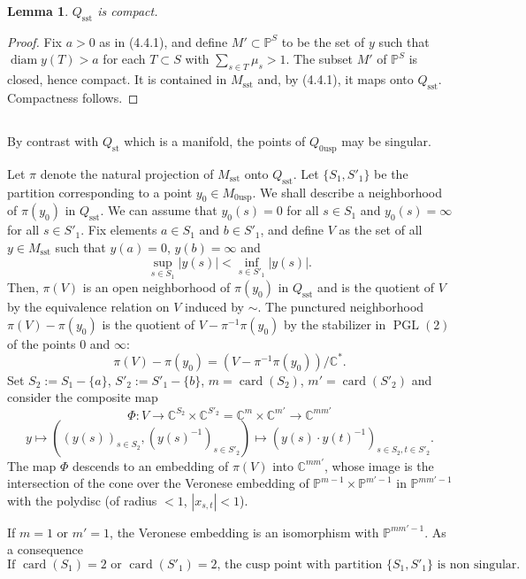 \documentclass[12pt,a4paper]{article}
\theoremstyle{plain}
\newtheorem{lemma}[theorem]{Lemma}
\theoremstyle{definition}
\theoremstyle{remark}
\DeclareMathOperator{\card}{card}
\DeclareMathOperator{\diam}{diam}
\DeclareMathOperator{\PGL}{PGL}
\newcommand{\CC}{\mathbb{C}}
\newcommand{\PP}{\mathbb{P}}
\numberwithin{equation}{section}
\providecommand{\CC}{\mathbb{C}}
\providecommand{\PP}{\mathbb{P}}
\providecommand{\PGL}{\operatorname{PGL}}
\begin{document}
\begin{lemma}\label{lem:4.4.2}
$Q_{\mathrm{sst}}$ is compact.
\end{lemma}

\begin{proof}
Fix $a > 0$ as in (4.4.1), and define $M' \subset \PP^S$ to be the set of $y$ such that $\diam y(T) > a$ for each $T \subset S$ with $\sum_{s \in T} \mu_s > 1$. The subset $M'$ of $\PP^S$ is closed, hence compact. It is contained in $M_{\mathrm{sst}}$ and, by (4.4.1), it maps onto $Q_{\mathrm{sst}}$. Compactness follows.
\end{proof}

\subsection{}
By contrast with $Q_{\mathrm{st}}$ which is a manifold, the points of $Q_{0\mathrm{usp}}$ may be singular.

Let $\pi$ denote the natural projection of $M_{\mathrm{sst}}$ onto $Q_{\mathrm{sst}}$. Let $\{S_1, S'_1\}$ be the partition corresponding to a point $y_0 \in M_{0\mathrm{usp}}$. We shall describe a neighborhood of $\pi(y_0)$ in $Q_{\mathrm{sst}}$. We can assume that $y_0(s) = 0$ for all $s \in S_1$ and $y_0(s) = \infty$ for all $s \in S'_1$. Fix elements $a \in S_1$ and $b \in S'_1$, and define $V$ as the set of all $y \in M_{\mathrm{sst}}$ such that $y(a) = 0$, $y(b) = \infty$ and
\[
\sup_{s \in S_1} |y(s)| < \inf_{s \in S'_1} |y(s)|.
\]
Then, $\pi(V)$ is an open neighborhood of $\pi(y_0)$ in $Q_{\mathrm{sst}}$ and is the quotient of $V$ by the equivalence relation on $V$ induced by $\sim$. The punctured neighborhood $\pi(V) - \pi(y_0)$ is the quotient of $V - \pi^{-1}\pi(y_0)$ by the stabilizer in $\PGL(2)$ of the points $0$ and $\infty$:
\[
\pi(V) - \pi(y_0) = (V - \pi^{-1}\pi(y_0))/\CC^*.
\]
Set $S_2 := S_1 - \{a\}$, $S'_2 := S'_1 - \{b\}$, $m = \card(S_2)$, $m' = \card(S'_2)$ and consider the composite map
\[
\Phi: V \to \CC^{S_2} \times \CC^{S'_2} = \CC^m \times \CC^{m'} \to \CC^{mm'}
\]
\[
y \mapsto ((y(s))_{s \in S_2}, (y(s)^{-1})_{s \in S'_2}) \mapsto (y(s) \cdot y(t)^{-1})_{s \in S_2, t \in S'_2}.
\]
The map $\Phi$ descends to an embedding of $\pi(V)$ into $\CC^{mm'}$, whose image is the intersection of the cone over the Veronese embedding of $\PP^{m-1} \times \PP^{m'-1}$ in $\PP^{mm'-1}$ with the polydisc (of radius $< 1$, $|x_{s,t}| < 1$).

If $m = 1$ or $m' = 1$, the Veronese embedding is an isomorphism with $\PP^{mm'-1}$. As a consequence
\begin{equation}\label{eq:4.5.1}
\text{If $\card(S_1) = 2$ or $\card(S'_1) = 2$, the cusp point with partition $\{S_1, S'_1\}$ is non singular.}
\end{equation}
\end{document}
